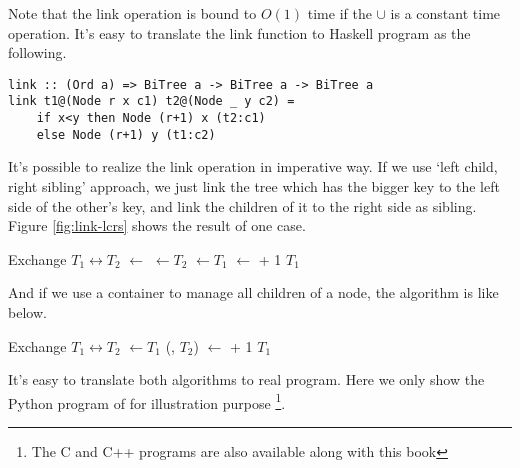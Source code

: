\documentclass{article}
\begin{document}
Note that the link operation is bound to $O(1)$ time if the $\cup$ is 
a constant time operation. It's easy
to translate the link function to Haskell program as the following.

\lstset{language=Haskell}
\begin{lstlisting}
link :: (Ord a) => BiTree a -> BiTree a -> BiTree a
link t1@(Node r x c1) t2@(Node _ y c2) = 
    if x<y then Node (r+1) x (t2:c1)
    else Node (r+1) y (t1:c2)
\end{lstlisting}

It's possible to realize the link operation in imperative way.
If we use `left child, right sibling' approach, we just link
the tree which has the bigger key to the left side of the other's
key, and link the children of it to the right side as sibling.
Figure \ref{fig:link-lcrs} shows the result of one case.

\begin{algorithmic}[1]
    \State Exchange $T_1 \leftrightarrow T_2$
  \EndIf
  \State {} $\gets$ 
  \State {} $\gets T_2$
  \State {} $\gets T_1$
  \State {} $\gets$  + 1
  \State \Return $T_1$
\EndFunction
\end{algorithmic}


And if we use a container to manage all children of a node, the
algorithm is like below.

\begin{algorithmic}[1]
    \State Exchange $T_1 \leftrightarrow T_2$
  \EndIf
  \State {} $\gets T_1$
  \State {}(, $T_2$)
  \State {} $\gets$  + 1
  \State \Return $T_1$
\EndFunction
\end{algorithmic}

It's easy to translate both algorithms to real program. Here we only show the Python program of  for illustration purpose \footnote{The C and C++ programs are also available along with this book}.
\end{document}

